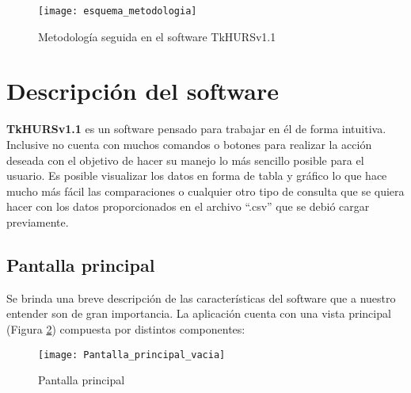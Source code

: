 \begin{figure}[H]
\centering
\texttt{[image: esquema\_metodologia]}
\caption{Metodología seguida en el software TkHURSv1.1}
\label{fig:esquema_metodologia}
\end{figure}

\pagebreak

\section{Descripción del software}

\textbf{ TkHURSv1.1} es un software pensado para trabajar en él de forma intuitiva. Inclusive no cuenta con muchos comandos o botones para realizar la acción deseada con el objetivo de hacer su manejo lo más sencillo posible para el usuario. Es posible visualizar los datos en forma de tabla y gráfico lo que hace mucho más fácil las comparaciones o cualquier otro tipo de consulta que se quiera hacer con los datos proporcionados en el archivo ``.csv'' que se debió cargar previamente. 


\subsection{Pantalla principal}

Se brinda una breve descripción de las características del software que a nuestro entender son de gran importancia. La aplicación cuenta con una vista principal (Figura \ref{fig:Pantalla_principal_vacia}) compuesta por distintos componentes:
\\

\begin{figure}[H]
\centering
\texttt{[image: Pantalla\_principal\_vacia]}
\caption{Pantalla principal}
\label{fig:Pantalla_principal_vacia}
\end{figure}

\pagebreak

